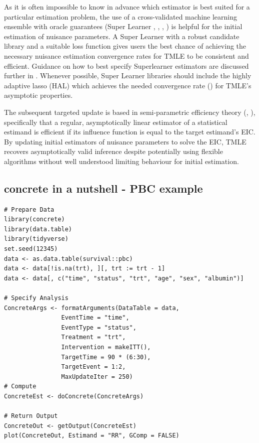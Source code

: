 \documentclass{report}
\newcommand{\1}{\ensuremath{\mathbf{1}}}
\begin{document}
As it is often impossible to know in advance which estimator is best suited for a particular estimation problem, the use of a cross-validated machine learning ensemble with oracle guarantees (Super Learner \cite{laan_super_2007}, \cite{polley_superlearner_2021}, \cite{laan_unified_2003}, \cite{vaart_oracle_2006}) is helpful for the initial estimation of nuisance parameters. A Super Learner with a robust candidate library and a suitable loss function gives users the best chance of achieving the necessary nuisance estimation convergence rates for TMLE to be consistent and efficient. Guidance on how to best specify Superlearner estimators are discussed further in \cite{phillips_practical_2022}. Whenever possible, Super Learner libraries should include the highly adaptive lasso (HAL) which achieves the needed convergence rate (\cite{laan_generally_2017,benkeser_highly_2016,rytgaard_continuous-time_2021}) for TMLE's asymptotic properties.

The subsequent targeted update is based in semi-parametric efficiency theory (\cite{laan_targeted_2011}, \cite{kennedy_semiparametric_2016}), specifically that a regular, asymptotically linear estimator of a statistical estimand is efficient if its influence function is equal to the target estimand's EIC. By updating initial estimators of nuisance parameters to solve the EIC, TMLE recovers asymptotically valid inference despite potentially using flexible algorithms without well understood limiting behaviour for initial estimation.

\subsection{concrete in a nutshell - PBC example}
\label{sec:orge88e587}
\begin{lstlisting}
# Prepare Data
library(concrete)
library(data.table)
library(tidyverse)
set.seed(12345)
data <- as.data.table(survival::pbc)
data <- data[!is.na(trt), ][, trt := trt - 1]
data <- data[, c("time", "status", "trt", "age", "sex", "albumin")]

# Specify Analysis
ConcreteArgs <- formatArguments(DataTable = data,
				EventTime = "time",
				EventType = "status",
				Treatment = "trt",
				Intervention = makeITT(),
				TargetTime = 90 * (6:30),
				TargetEvent = 1:2,
				MaxUpdateIter = 250)
# Compute
ConcreteEst <- doConcrete(ConcreteArgs)

# Return Output
ConcreteOut <- getOutput(ConcreteEst)
plot(ConcreteOut, Estimand = "RR", GComp = FALSE)
\end{lstlisting}
\end{document}
